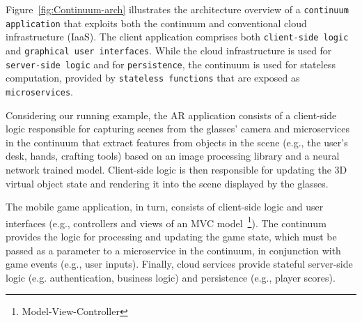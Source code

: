
Figure~\ref{fig:Continuum-arch} illustrates the architecture overview of a \texttt{continuum application} that exploits both the continuum and conventional cloud infrastructure (IaaS). The client application comprises both \texttt{client-side logic} and \texttt{graphical user interfaces}. While the cloud infrastructure is used for \texttt{server-side logic} and for \texttt{persistence}, the continuum is used for stateless computation, provided by \texttt{stateless functions} that are exposed as \texttt{microservices}. 



Considering our running example, the AR application consists of a client-side logic responsible for capturing scenes from the glasses' camera and microservices in the continuum that extract features from objects in the scene (e.g., the user's desk, hands, crafting tools) based on an image processing library and a neural network trained model. Client-side logic is then responsible for updating the 3D virtual object state and rendering it into the scene displayed by the glasses.

The mobile game application, in turn, consists of client-side logic and user interfaces (e.g., controllers and views of an MVC model~\footnote{Model-View-Controller}). The continuum provides the logic for processing and updating the game state, which must be passed as a parameter to a microservice in the continuum, in conjunction with game events (e.g., user inputs). Finally, cloud services provide stateful server-side logic (e.g. authentication, business logic) and persistence (e.g., player scores). 


